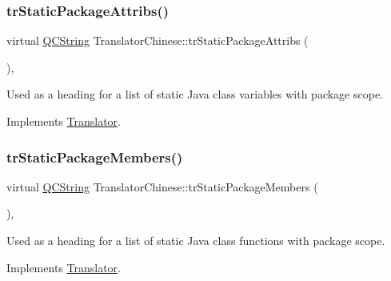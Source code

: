 \mbox{\label{class_translator_chinese_aa7d7f9013d65ef116d02a1f0432d970b}} 
\subsubsection{\texorpdfstring{trStaticPackageAttribs()}{trStaticPackageAttribs()}}
{\footnotesize\ttfamily virtual \mbox{\hyperlink{class_q_c_string}{Q\+C\+String}} Translator\+Chinese\+::tr\+Static\+Package\+Attribs (\begin{DoxyParamCaption}{ }\end{DoxyParamCaption})\hspace{0.3cm}{\ttfamily [inline]}, {\ttfamily [virtual]}}

Used as a heading for a list of static Java class variables with package scope. 

Implements \mbox{\hyperlink{class_translator}{Translator}}.

\mbox{\label{class_translator_chinese_a1089b9469259c2a3fcfe04d961d9a3df}} 
\subsubsection{\texorpdfstring{trStaticPackageMembers()}{trStaticPackageMembers()}}
{\footnotesize\ttfamily virtual \mbox{\hyperlink{class_q_c_string}{Q\+C\+String}} Translator\+Chinese\+::tr\+Static\+Package\+Members (\begin{DoxyParamCaption}{ }\end{DoxyParamCaption})\hspace{0.3cm}{\ttfamily [inline]}, {\ttfamily [virtual]}}

Used as a heading for a list of static Java class functions with package scope. 

Implements \mbox{\hyperlink{class_translator}{Translator}}.

\mbox{\label{class_translator_chinese_a0ad7d991fbd21f55b25b4d9d57896da0}} 
